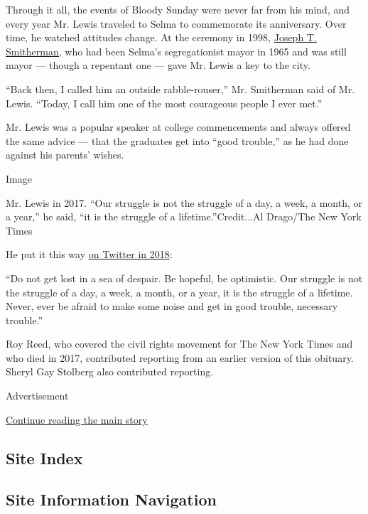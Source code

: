 Through it all, the events of Bloody Sunday were never far from his
mind, and every year Mr. Lewis traveled to Selma to commemorate its
anniversary. Over time, he watched attitudes change. At the ceremony in
1998,
\href{https://www.nytimes.com/2005/09/13/us/joseph-smitherman-mayor-in-selma-strife-dies-at-75.html}{Joseph
T. Smitherman,} who had been Selma's segregationist mayor in 1965 and
was still mayor --- though a repentant one --- gave Mr. Lewis a key to
the city.

``Back then, I called him an outside rabble-rouser,'' Mr. Smitherman
said of Mr. Lewis. ``Today, I call him one of the most courageous people
I ever met.''

Mr. Lewis was a popular speaker at college commencements and always
offered the same advice --- that the graduates get into ``good
trouble,'' as he had done against his parents' wishes.

Image

Mr. Lewis in 2017. ``Our struggle is not the struggle of a day, a week,
a month, or a year,'' he said, ``it is the struggle of a
lifetime.''Credit...Al Drago/The New York Times

He put it this way
\href{https://twitter.com/repjohnlewis/status/1011991303599607808?lang=en}{on
Twitter in 2018}:

``Do not get lost in a sea of despair. Be hopeful, be optimistic. Our
struggle is not the struggle of a day, a week, a month, or a year, it is
the struggle of a lifetime. Never, ever be afraid to make some noise and
get in good trouble, necessary trouble.''

Roy Reed, who covered the civil rights movement for The New York Times
and who died in 2017, contributed reporting from an earlier version of
this obituary. Sheryl Gay Stolberg also contributed reporting.

Advertisement

\protect\hyperlink{after-bottom}{Continue reading the main story}

\hypertarget{site-index}{%
\subsection{Site Index}\label{site-index}}

\hypertarget{site-information-navigation}{%
\subsection{Site Information
Navigation}\label{site-information-navigation}}

